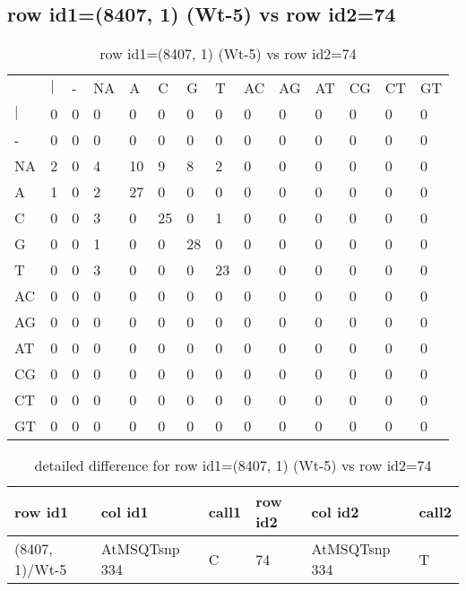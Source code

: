 \subsection{row id1=(8407, 1) (Wt-5) vs row id2=74}
\begin{center}
\begin{longtable}{|l|l|l|l|l|l|l|l|l|l|l|l|l|l|}
\caption{row id1=(8407, 1) (Wt-5) vs row id2=74} \label{table_dm482}\\
\hline
\\
\hline
&$|$&-&NA&A&C&G&T&AC&AG&AT&CG&CT&GT\\
$|$&0&0&0&0&0&0&0&0&0&0&0&0&0\\
-&0&0&0&0&0&0&0&0&0&0&0&0&0\\
NA&2&0&4&10&9&8&2&0&0&0&0&0&0\\
A&1&0&2&27&0&0&0&0&0&0&0&0&0\\
C&0&0&3&0&25&0&1&0&0&0&0&0&0\\
G&0&0&1&0&0&28&0&0&0&0&0&0&0\\
T&0&0&3&0&0&0&23&0&0&0&0&0&0\\
AC&0&0&0&0&0&0&0&0&0&0&0&0&0\\
AG&0&0&0&0&0&0&0&0&0&0&0&0&0\\
AT&0&0&0&0&0&0&0&0&0&0&0&0&0\\
CG&0&0&0&0&0&0&0&0&0&0&0&0&0\\
CT&0&0&0&0&0&0&0&0&0&0&0&0&0\\
GT&0&0&0&0&0&0&0&0&0&0&0&0&0\\
\hline
\end{longtable}
\end{center}

\begin{center}
\begin{longtable}{|l|l|l|l|l|l|}
\caption{detailed difference for row id1=(8407, 1) (Wt-5) vs row id2=74} \label{table_dm483}\\
\hline
row id1&col id1&call1&row id2&col id2&call2\\
\hline
(8407, 1)/Wt-5&AtMSQTsnp 334&C&74&AtMSQTsnp 334&T\\
\hline
\end{longtable}
\end{center}

